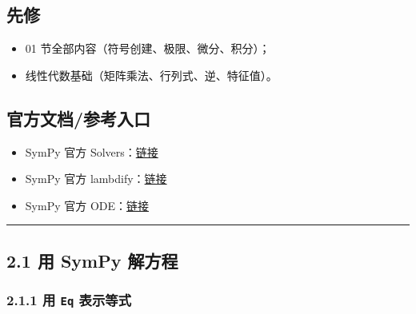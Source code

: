 \subsection{先修}\label{ux5148ux4fee-5}

\begin{itemize}
\tightlist
\item
  01 节全部内容（符号创建、极限、微分、积分）；
\item
  线性代数基础（矩阵乘法、行列式、逆、特征值）。
\end{itemize}

\subsection{官方文档/参考入口}\label{ux5b98ux65b9ux6587ux6863ux53c2ux8003ux5165ux53e3-1}

\begin{itemize}
\tightlist
\item
  SymPy 官方
  Solvers：\href{https://docs.sympy.org/latest/modules/solvers/index.html}{链接}
\item
  SymPy 官方
  lambdify：\href{https://docs.sympy.org/latest/modules/utilities/lambdify.html}{链接}
\item
  SymPy 官方
  ODE：\href{https://docs.sympy.org/latest/modules/solvers/ode.html}{链接}
\end{itemize}

\begin{center}\rule{0.5\linewidth}{0.5pt}\end{center}

\subsection{2.1 用 SymPy 解方程}\label{ux7528-sympy-ux89e3ux65b9ux7a0b}

\subsubsection{\texorpdfstring{2.1.1 用 \texttt{Eq}
表示等式}{2.1.1 用 Eq 表示等式}}\label{ux7528-eq-ux8868ux793aux7b49ux5f0f}

\begin{Shaded}
\begin{Highlighting}[]
\OperatorTok{=}\NormalTok{)}
\OperatorTok{=}\OperatorTok{**}\NormalTok{, }\NormalTok{)}
\end{Highlighting}
\end{Shaded}

